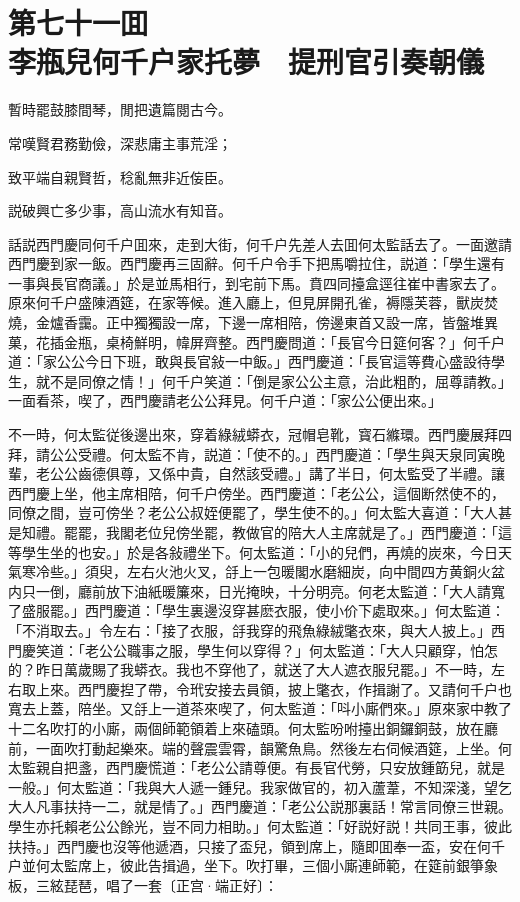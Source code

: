 
\chapter*{第七十一囬　\\李瓶兒何千户家托夢　提刑官引奏朝儀}


\begin{myquote}
暫時罷鼓膝間琴，閒把遺篇閱古今。

常嘆賢君務勤儉，深悲庸主事荒淫；

致平端自親賢哲，稔亂無非近侫臣。

説破興亡多少事，高山流水有知音。
\end{myquote}

話説西門慶同何千户囬來，走到大街，何千户先差人去囬何太監話去了。一面邀請西門慶到家一飯。西門慶再三固辭。何千户令手下把馬嚼拉住，説道：「學生還有一事與長官商議。」於是並馬相行，到宅前下馬。賁四同擡盒逕往崔中書家去了。原來何千户盛陳酒筵，在家等候。進入廳上，但見屏開孔雀，褥隱芙蓉，獸炭焚燒，金爐香靄。正中獨獨設一席，下邊一席相陪，傍邊東首又設一席，皆盤堆異菓，花插金瓶，桌椅鮮明，幃屏齊整。西門慶問道：「長官今日筵何客？」何千户道：「家公公今日下班，敢與長官敍一中飯。」西門慶道：「長官這等費心盛設待學生，就不是同僚之情！」何千户笑道：「倒是家公公主意，治此粗酌，屈尊請教。」一面看茶，喫了，西門慶請老公公拜見。何千户道：「家公公便出來。」

不一時，何太監従後邊出來，穿着綠絨蟒衣，冠帽皂靴，寳石縧環。西門慶展拜四拜，請公公受禮。何太監不肯，説道：「使不的。」西門慶道：「學生與天泉同寅晚輩，老公公齒德俱尊，又係中貴，自然該受禮。」講了半日，何太監受了半禮。讓西門慶上坐，他主席相陪，何千户傍坐。西門慶道：「老公公，這個断然使不的，同僚之間，豈可傍坐？老公公叔姪便罷了，學生使不的。」何太監大喜道：「大人甚是知禮。罷罷，我閣老位兒傍坐罷，教做官的陪大人主席就是了。」西門慶道：「這等學生坐的也安。」於是各敍禮坐下。何太監道：「小的兒們，再燒的炭來，今日天氣寒冷些。」須臾，左右火池火叉，㧱上一包暖閣水磨細炭，向中間四方黄銅火盆内只一倒，廳前放下油紙暖簾來，日光掩映，十分明亮。何老太監道：「大人請寬了盛服罷。」西門慶道：「學生裏邊沒穿甚麽衣服，使小价下處取來。」何太監道：「不消取去。」令左右：「接了衣服，㧱我穿的飛魚綠絨氅衣來，與大人披上。」西門慶笑道：「老公公職事之服，學生何以穿得？」何太監道：「大人只顧穿，怕怎的？昨日萬歲賜了我蟒衣。我也不穿他了，就送了大人遮衣服兒罷。」不一時，左右取上來。西門慶揑了帶，令玳安接去員領，披上氅衣，作揖謝了。又請何千户也寬去上蓋，陪坐。又㧱上一道茶來喫了，何太監道：「呌小廝們來。」原來家中教了十二名吹打的小廝，兩個師範領着上來磕頭。何太監吩咐擡出銅鑼銅鼓，放在廳前，一面吹打動起樂來。端的聲震雲霄，韻驚魚鳥。然後左右伺候酒筵，上坐。何太監親自把盞，西門慶慌道：「老公公請尊便。有長官代勞，只安放鍾筯兒，就是一般。」何太監道：「我與大人遞一鍾兒。我家做官的，初入蘆葦，不知深淺，望乞大人凡事扶持一二，就是情了。」西門慶道：「老公公説那裏話！常言同僚三世親。學生亦托賴老公公餘光，豈不同力相助。」何太監道：「好説好説！共同王事，彼此扶持。」西門慶也沒等他遞酒，只接了盃兒，領到席上，隨即囬奉一盃，安在何千户並何太監席上，彼此告揖過，坐下。吹打畢，三個小廝連師範，在筵前銀箏象板，三絃琵琶，唱了一套〔正宫·端正好〕：

